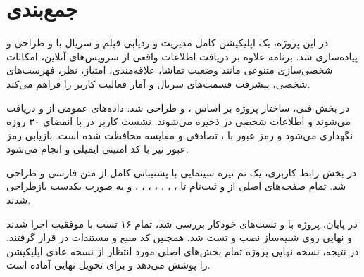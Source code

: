\documentclass[a4paper,14pt]{extarticle}
\begin{document}
\section*{جمع‌بندی}

در این پروژه، یک اپلیکیشن کامل مدیریت و ردیابی فیلم و سریال با  و  طراحی و پیاده‌سازی شد. برنامه علاوه بر دریافت اطلاعات واقعی از سرویس‌های آنلاین، امکانات شخصی‌سازی متنوعی مانند وضعیت تماشا، علاقه‌مندی، امتیاز، نظر، فهرست‌های شخصی، پیشرفت قسمت‌های سریال و آمار فعالیت کاربر را فراهم می‌کند.

در بخش فنی، ساختار پروژه بر اساس ،  و  طراحی شد. داده‌های عمومی از  و  دریافت می‌شوند و اطلاعات شخصی در  ذخیره می‌شوند. نشست کاربر در  با انقضای ۳۰ روزه نگهداری می‌شود و رمز عبور با ،  تصادفی و مقایسه  محافظت شده است. بازیابی رمز عبور نیز با کد امنیتی ایمیلی و  انجام می‌شود.

در بخش رابط کاربری، یک تم تیره سینمایی با پشتیبانی کامل از متن فارسی و  طراحی شد. تمام صفحه‌های اصلی از  و ثبت‌نام تا ، ، ، ، ، ، ،  و  به صورت یکدست بازطراحی شدند.

در پایان، پروژه با  و تست‌های خودکار بررسی شد، تمام ۱۶ تست با موفقیت اجرا شدند و  نهایی  روی شبیه‌ساز نصب و تست شد. همچنین کد منبع و مستندات در  قرار گرفتند. در نتیجه، نسخه نهایی پروژه تمام بخش‌های اصلی مورد انتظار از نسخه عادی اپلیکیشن را پوشش می‌دهد و برای تحویل نهایی آماده است.
\end{document}
